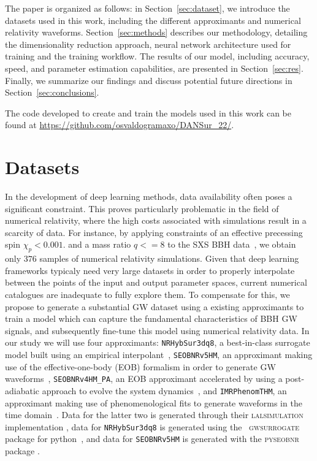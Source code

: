 \documentclass[%
 reprint,
superscriptaddress,
nofootinbib,
 amsmath,amssymb,
 aps,
prd,
floatfix,
]{revtex4-2}
\newcommand{\change}[1]{#1}
\begin{document}
The paper is organized as follows: in Section~\ref{sec:dataset}, we introduce the datasets used in this work, including the different approximants and numerical relativity waveforms. Section~\ref{sec:methods} describes our methodology, detailing the dimensionality reduction approach, neural network architecture used for training and the training workflow. The results of our model, including accuracy, speed, and parameter estimation capabilities, are presented in Section~\ref{sec:res}\@. Finally, we summarize our findings and discuss potential future directions in Section~\ref{sec:conclusions}.

The  code developed to create and train the models used in this work can be found at \url{https://github.com/osvaldogramaxo/DANSur_22/}.


\section{\label{sec:dataset} Datasets}
In the development of deep learning methods, data availability often poses a significant constraint. This proves particularly problematic in the field of numerical relativity, where the high costs associated with simulations result in a scarcity of data. For instance, by applying constraints of an effective precessing spin $\chi_p < 0.001.$ and a mass ratio $q < =8$ to the SXS BBH data~\cite{SXS}, we obtain only $376$ samples of numerical relativity simulations. Given that deep learning frameworks typicaly need very large datasets in order to properly interpolate between the points of the input and output parameter spaces,  current numerical catalogues are inadequate to fully explore them.
To compensate for this, we propose to generate a substantial GW dataset using a existing approximants to train a model which can capture the fundamental characteristics of BBH GW signals, and subsequently fine-tune this model using numerical relativity data. \change{In our study we will use four approximants: \texttt{NRHybSur3dq8}, a best-in-class surrogate model built using an empirical interpolant~\cite{NRSur7dq8ref}, \texttt{SEOBNRv5HM}, an approximant making use of the effective-one-body (EOB) formalism in order to generate GW waveforms~\cite{SEOBNRv5HM}, \texttt{SEOBNRv4HM\_PA}, an EOB approximant accelerated by using a post-adiabatic approach to evolve the system dynamics~\cite{SEOBNRv4HM_PA}, and \texttt{IMRPhenomTHM}, an approximant making use of phenomenological fits to generate waveforms in the time domain~\cite{IMRPhenomTHM}. 
Data for the latter two is generated through their \textsc{lalsimulation} implementation \cite{lalsuite}, data for \texttt{NRHybSur3dq8} is generated using the ~\textsc{gwsurrogate} package for python~\cite{gwsurrogate_ref}, and data for \texttt{SEOBNRv5HM} is generated with the \textsc{pyseobnr} package \cite{pyseobnr}.
}
\end{document}
